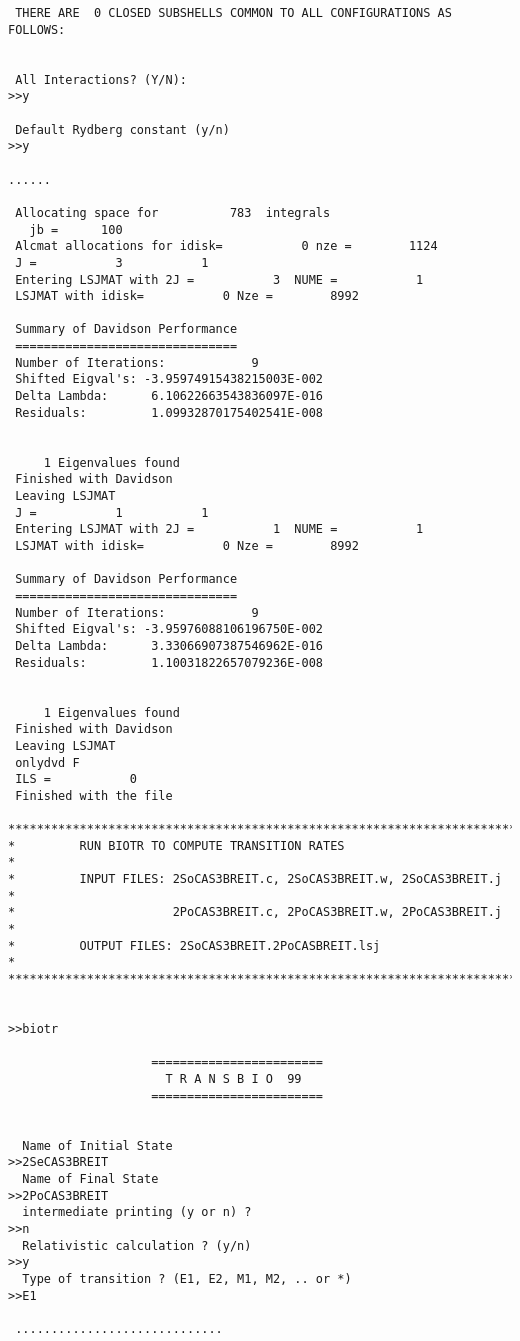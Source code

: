 \documentclass[fleqn,10pt]{book}
\begin{document}
\begin{verbatim}
 THERE ARE  0 CLOSED SUBSHELLS COMMON TO ALL CONFIGURATIONS AS FOLLOWS:


 All Interactions? (Y/N):
>>y

 Default Rydberg constant (y/n)
>>y

......

 Allocating space for          783  integrals
   jb =      100
 Alcmat allocations for idisk=           0 nze =        1124
 J =           3           1
 Entering LSJMAT with 2J =           3  NUME =           1
 LSJMAT with idisk=           0 Nze =        8992

 Summary of Davidson Performance
 ===============================
 Number of Iterations:            9
 Shifted Eigval's: -3.95974915438215003E-002
 Delta Lambda:      6.10622663543836097E-016
 Residuals:         1.09932870175402541E-008


     1 Eigenvalues found
 Finished with Davidson
 Leaving LSJMAT
 J =           1           1
 Entering LSJMAT with 2J =           1  NUME =           1
 LSJMAT with idisk=           0 Nze =        8992

 Summary of Davidson Performance
 ===============================
 Number of Iterations:            9
 Shifted Eigval's: -3.95976088106196750E-002
 Delta Lambda:      3.33066907387546962E-016
 Residuals:         1.10031822657079236E-008


     1 Eigenvalues found
 Finished with Davidson
 Leaving LSJMAT
 onlydvd F
 ILS =           0
 Finished with the file
 
*******************************************************************************
*         RUN BIOTR TO COMPUTE TRANSITION RATES                               *
*         INPUT FILES: 2SoCAS3BREIT.c, 2SoCAS3BREIT.w, 2SoCAS3BREIT.j         *
*                      2PoCAS3BREIT.c, 2PoCAS3BREIT.w, 2PoCAS3BREIT.j         *
*         OUTPUT FILES: 2SoCAS3BREIT.2PoCASBREIT.lsj                          *
******************************************************************************* 
 
 
>>biotr

                    ========================
                      T R A N S B I O  99 
                    ========================


  Name of Initial State
>>2SeCAS3BREIT
  Name of Final State
>>2PoCAS3BREIT
  intermediate printing (y or n) ?  
>>n
  Relativistic calculation ? (y/n) 
>>y
  Type of transition ? (E1, E2, M1, M2, .. or *) 
>>E1
 
 .............................
 

\end{verbatim}
\end{document}

